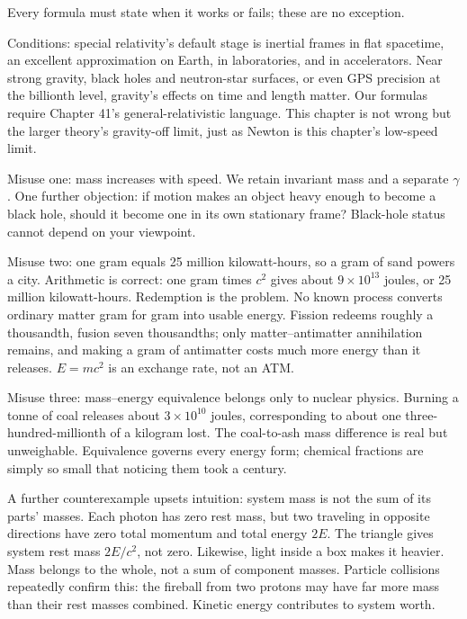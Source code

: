 \begin{mainline}
Every formula must state when it works or fails; these are no exception.

Conditions: special relativity's default stage is inertial frames in flat spacetime, an excellent approximation on Earth, in laboratories, and in accelerators. Near strong gravity, black holes and neutron-star surfaces, or even GPS precision at the billionth level, gravity's effects on time and length matter. Our formulas require Chapter 41's general-relativistic language. This chapter is not wrong but the larger theory's gravity-off limit, just as Newton is this chapter's low-speed limit.

Misuse one: mass increases with speed. We retain invariant mass and a separate \(\gamma\). One further objection: if motion makes an object heavy enough to become a black hole, should it become one in its own stationary frame? Black-hole status cannot depend on your viewpoint.

Misuse two: one gram equals 25 million kilowatt-hours, so a gram of sand powers a city. Arithmetic is correct: one gram times \(c^{2}\) gives about \(9\times10^{13}\) joules, or 25 million kilowatt-hours. Redemption is the problem. No known process converts ordinary matter gram for gram into usable energy. Fission redeems roughly a thousandth, fusion seven thousandths; only matter--antimatter annihilation remains, and making a gram of antimatter costs much more energy than it releases. \(E=mc^{2}\) is an exchange rate, not an ATM.

Misuse three: mass--energy equivalence belongs only to nuclear physics. Burning a tonne of coal releases about \(3\times10^{10}\) joules, corresponding to about one three-hundred-millionth of a kilogram lost. The coal-to-ash mass difference is real but unweighable. Equivalence governs every energy form; chemical fractions are simply so small that noticing them took a century.

A further counterexample upsets intuition: system mass is not the sum of its parts' masses. Each photon has zero rest mass, but two traveling in opposite directions have zero total momentum and total energy \(2E\). The triangle gives system rest mass \(2E/c^{2}\), not zero. Likewise, light inside a box makes it heavier. Mass belongs to the whole, not a sum of component masses. Particle collisions repeatedly confirm this: the fireball from two protons may have far more mass than their rest masses combined. Kinetic energy contributes to system worth.


\end{mainline}
